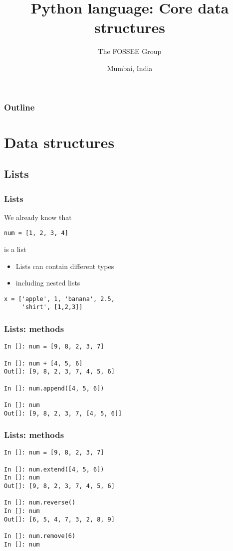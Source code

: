 \documentclass[14pt,compress]{beamer}
\title[Data structures]{Python language: Core data structures}
\author[FOSSEE Team] {The FOSSEE Group}
\institute[IIT Bombay] {Department of Aerospace Engineering\\IIT Bombay}
\date[] {Mumbai, India}
\begin{document}
\begin{frame}
  \titlepage
\end{frame}

\begin{frame}
  \frametitle{Outline}
  \tableofcontents
\end{frame}

\section{Data structures}
\subsection{Lists}
\begin{frame}[fragile]
  \frametitle{Lists}
\begin{block}{We already know that}
  \begin{lstlisting}
num = [1, 2, 3, 4]
  \end{lstlisting}
is a list
\end{block}
\pause
\begin{itemize}
\item Lists can contain different types
\item including nested lists
\end{itemize}
\begin{lstlisting}
x = ['apple', 1, 'banana', 2.5,
     'shirt', [1,2,3]]
\end{lstlisting}
\end{frame}

\begin{frame}[fragile]
  \frametitle{Lists: methods}
  \begin{lstlisting}
In []: num = [9, 8, 2, 3, 7]

In []: num + [4, 5, 6]
Out[]: [9, 8, 2, 3, 7, 4, 5, 6]

In []: num.append([4, 5, 6])

In []: num
Out[]: [9, 8, 2, 3, 7, [4, 5, 6]]
  \end{lstlisting}
\end{frame}

\begin{frame}[fragile]
  \frametitle{Lists: methods}
  \begin{lstlisting}
In []: num = [9, 8, 2, 3, 7]

In []: num.extend([4, 5, 6])
In []: num
Out[]: [9, 8, 2, 3, 7, 4, 5, 6]

In []: num.reverse()
In []: num
Out[]: [6, 5, 4, 7, 3, 2, 8, 9]

In []: num.remove(6)
In []: num
  \end{lstlisting}
\end{frame}
\end{document}
